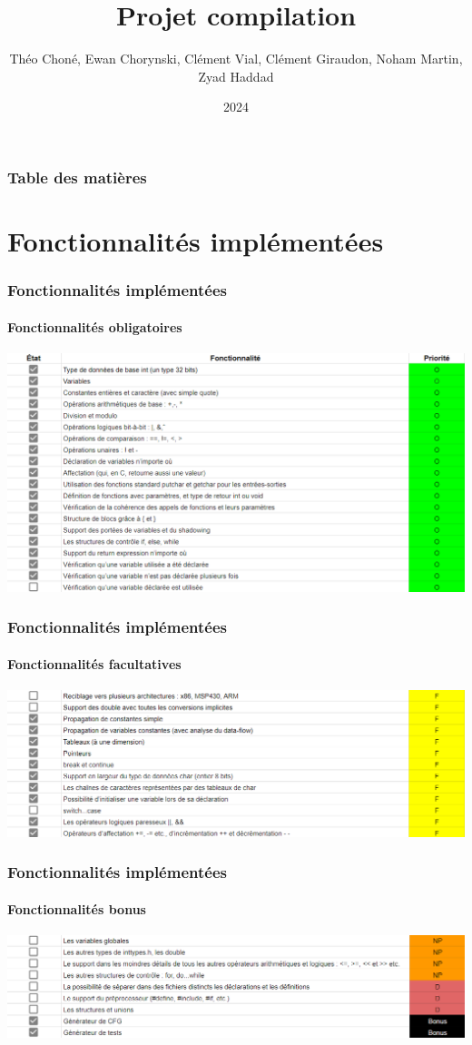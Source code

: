 \documentclass{beamer}
\title[Projet compilation]{Projet compilation}
\author[Hexanomnom]{Théo Choné, Ewan Chorynski, Clément Vial, Clément Giraudon, Noham Martin, Zyad Haddad}
\institute[INSA Lyon]{INSA Lyon}
\date{2024}
\begin{document}
\frame{\titlepage}

\begin{frame}
    \frametitle{Table des matières}
    \tableofcontents
\end{frame}

\section{Fonctionnalités implémentées}

\begin{frame}
    \frametitle{Fonctionnalités implémentées}
    \framesubtitle{Fonctionnalités obligatoires}
    \begin{center}
        \includegraphics[width=\textwidth,height=0.8\textheight,keepaspectratio]{fonctionnalite1.png}
    \end{center}
\end{frame}

\begin{frame}
    \frametitle{Fonctionnalités implémentées}
    \framesubtitle{Fonctionnalités facultatives}
    \begin{center}
        \includegraphics[width=\textwidth,height=0.8\textheight,keepaspectratio]{fonctionnalite2.png}
    \end{center}
\end{frame}

\begin{frame}
    \frametitle{Fonctionnalités implémentées}
    \framesubtitle{Fonctionnalités bonus}
    \begin{center}
        \includegraphics[width=\textwidth,height=0.8\textheight,keepaspectratio]{fonctionnalite3.png}
    \end{center}
\end{frame}
\end{document}
